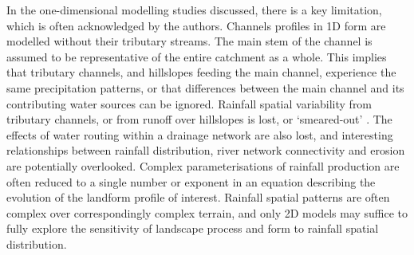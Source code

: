 In the one-dimensional modelling studies discussed, there is a key limitation, which is often acknowledged by the authors. Channels profiles in 1D form are modelled without their tributary streams. The main stem of the channel is assumed to be representative of the entire catchment as a whole. This implies that tributary channels, and hillslopes feeding the main channel, experience the same precipitation patterns, or that differences between the main channel and its contributing water sources can be ignored. Rainfall spatial variability from tributary channels, or from runoff over hillslopes is lost, or `smeared-out' \citep{Roe2002}. The effects of water routing within a drainage network are also lost, and interesting relationships between rainfall distribution, river network connectivity and erosion are potentially overlooked. Complex parameterisations of rainfall production are often reduced to a single number or exponent in an equation describing the evolution of the landform profile of interest. Rainfall spatial patterns are often complex over correspondingly complex terrain, and only 2D models may suffice to fully explore the sensitivity of landscape process and form to rainfall spatial distribution.



